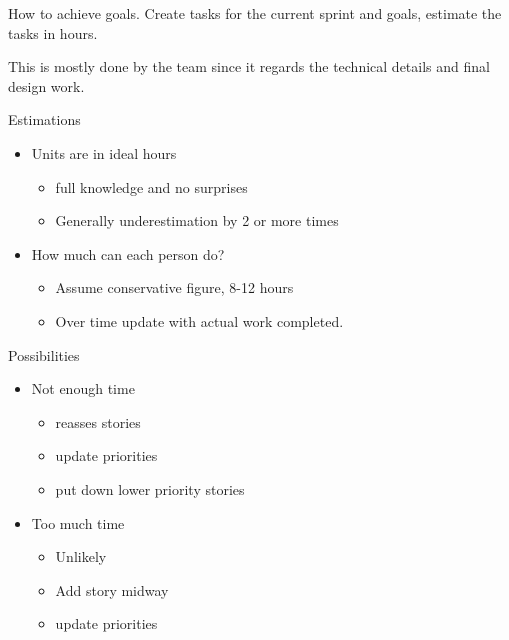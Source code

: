 \documentclass{report}
\begin{document}
\begin{description}
\begin{itemize}
                How to achieve goals. Create tasks for the current
                sprint and goals, estimate the tasks in hours.

                This is mostly done by the team since it regards the
                technical details and final design work.

        \end{itemize}

        Estimations
        \begin{itemize}
            \item Units are in ideal hours

                \begin{itemize}
                    \item full knowledge and no surprises
                    \item Generally underestimation by 2 or more times
                \end{itemize}

            \item How much can each person do?
                \begin{itemize}
                    \item Assume conservative figure, 8-12 hours
                    \item Over time update with actual work completed.
                \end{itemize}
        \end{itemize}

        Possibilities
        \begin{itemize}
            \item Not enough time
                \begin{itemize}
                    \item reasses stories
                    \item update priorities
                    \item put down lower priority stories
                \end{itemize}

            \item Too much time
                \begin{itemize}
                    \item Unlikely
                    \item Add story midway
                    \item update priorities
                \end{itemize}
        \end{itemize}


\end{description}
\end{document}
